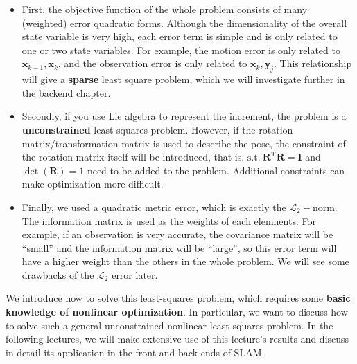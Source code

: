 \begin{itemize}
	\item First, the objective function of the whole problem consists of many (weighted) error quadratic forms. Although the dimensionality of the overall state variable is very high, each error term is simple and is only related to one or two state variables. For example, the motion error is only related to $\mathbf{x}_{k-1}, \mathbf{x}_k$, and the observation error is only related to $\mathbf{x}_k, \mathbf{y}_j$. This relationship will give a \textbf{sparse} least square problem, which we will investigate further in the backend chapter.
	\item Secondly, if you use Lie algebra to represent the increment, the problem is a \textbf{unconstrained} least-squares problem. However, if the rotation matrix/transformation matrix is ​​used to describe the pose, the constraint of the rotation matrix itself will be introduced, that is, $\mathrm{s.t.}\ \mathbf{R}^\mathrm{T} \mathbf{R} = \mathbf{I}$ and $\det (\mathbf{R})=1$ need to be added to the problem. Additional constraints can make optimization more difficult.
	\item Finally, we used a quadratic metric error, which is exactly the $\mathcal{L}_2-$norm. The information matrix is used as the weights of each elemnents. For example, if an observation is very accurate, the covariance matrix will be ``small'' and the information matrix will be ``large'', so this error term will have a higher weight than the others in the whole problem. We will see some drawbacks of the $\mathcal{L}_2$ error later.
\end{itemize}

We introduce how to solve this least-squares problem, which requires some \textbf{basic knowledge of nonlinear optimization}. In particular, we want to discuss how to solve such a general unconstrained nonlinear least-squares problem. In the following lectures, we will make extensive use of this lecture's results and discuss in detail its application in the front and back ends of SLAM\@.


